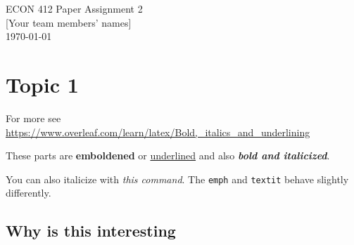  \noindent
\begin{minipage}[t]{.6\textwidth}
\raggedright
	\Large ECON 412 Paper Assignment 2 \\
 	\large [Your team members' names] \\
 	\today \\[1.5em] %
\end{minipage}%
%

\section{Topic 1}


For more see \url{https://www.overleaf.com/learn/latex/Bold,_italics_and_underlining}


These parts are \textbf{emboldened} 
or \underline{underlined} 
and also \textbf{\textit{bold and italicized}}.

You can also italicize with \emph{this command}. The \verb+emph+ and \verb+textit+ behave slightly differently.
\subsection{Why is this interesting}

